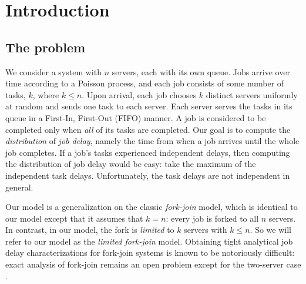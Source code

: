 \documentclass[sigconf]{acmart}
\begin{document}
\maketitle

\section{Introduction}

\subsection*{\normalsize{The problem}}
We consider a system with $n$ servers, each with its own queue.  Jobs arrive over time according to a Poisson process, and each job consists of some number of tasks, $k$, where $k\le n$.  Upon arrival, each job chooses $k$ distinct servers uniformly at random and sends one task to each server. Each server serves the tasks in its queue in a First-In, First-Out (FIFO) manner.  A job is considered to be completed only when \emph{all} of its tasks are completed.  Our goal is to compute the \emph{distribution} of \emph{job delay}, namely the time from when a job arrives until the whole job completes. If a job's tasks experienced independent delays, then computing the distribution of job delay would be easy: take the maximum of the independent task delays. Unfortunately, the task delays are not independent in general.

\begin{sloppypar}
Our model is a generalization on the classic \emph{fork-join} model, which is identical to our model except that it assumes that $k=n$: every job is forked to all $n$ servers.  In contrast, in our model, the fork is \emph{limited} to $k$ servers with $k\le n$.  So we will refer to our model as the \emph{limited fork-join} model.  Obtaining tight analytical job delay characterizations for fork-join systems is known to be notoriously difficult: exact analysis of fork-join remains an open problem except for the two-server case \cite{FlaHah_84,Bac_85}.
\end{sloppypar}
\end{document}
